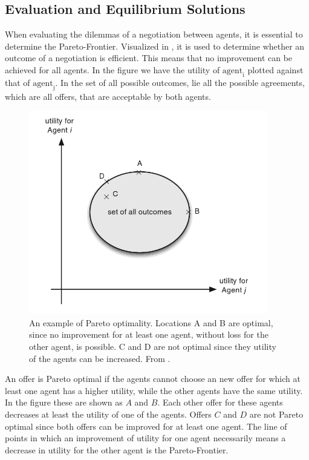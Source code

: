 \subsection{Evaluation and Equilibrium Solutions}
When evaluating the dilemmas of a negotiation between agents, it is essential to determine the Pareto-Frontier. Visualized in , it is used to determine whether an outcome of a negotiation is efficient. This means that no improvement can be achieved for all agents. In the figure we have the utility of $\text{agent}_\text{i}$ plotted against that of  $\text{agent}_\text{j}$. In the set of all possible outcomes, lie all the possible agreements, which are all offers, that are acceptable by both agents.

\begin{figure}[h]
	\centering
	\includegraphics[width=0.7\linewidth]{img/parito_optimal.png}
	\caption{An example of Pareto optimality. Locations A and B are optimal, since no improvement for at least one agent, without loss for the other agent, is possible. C and D are not optimal since they utility of the agents can be increased. From \citet{fatima2014principles}.}
	\label{fig:paritooptimal}
\end{figure}

An offer is Pareto optimal if the agents cannot choose an new offer for which at least one agent has a higher utility, while the other agents have the same utility. In the figure these are shown as $A$ and $B$. Each other offer for these agents decreases at least the utility of one of the agents. Offers $C$ and $D$ are not Pareto optimal since both offers can be improved for at least one agent. The line of points in which an improvement of utility for one agent necessarily means a decrease in utility for the other agent is the Pareto-Frontier. 


